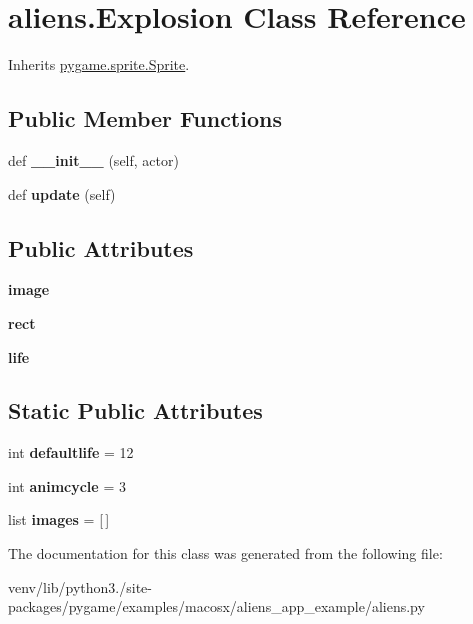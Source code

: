 \hypertarget{classaliens_1_1_explosion}{}\section{aliens.\+Explosion Class Reference}
\label{classaliens_1_1_explosion}


Inherits \hyperlink{classpygame_1_1sprite_1_1_sprite}{pygame.\+sprite.\+Sprite}.

\subsection*{Public Member Functions}
\begin{DoxyCompactItemize}
\item 
\mbox{\label{classaliens_1_1_explosion_a8f5dbf53038e55b33cdd5db265a7d8c6}} 
def {\bfseries \+\_\+\+\_\+init\+\_\+\+\_\+} (self, actor)
\item 
\mbox{\label{classaliens_1_1_explosion_a0440ed5f3211908560470309262a7822}} 
def {\bfseries update} (self)
\end{DoxyCompactItemize}
\subsection*{Public Attributes}
\begin{DoxyCompactItemize}
\item 
\mbox{\label{classaliens_1_1_explosion_af6c714dd11b3957b575b563ebb7a6f40}} 
{\bfseries image}
\item 
\mbox{\label{classaliens_1_1_explosion_a1112e2315638f71a08b31e8c18a6ef16}} 
{\bfseries rect}
\item 
\mbox{\label{classaliens_1_1_explosion_a02983ea0b6b88ebb2cdeb3928ae2f565}} 
{\bfseries life}
\end{DoxyCompactItemize}
\subsection*{Static Public Attributes}
\begin{DoxyCompactItemize}
\item 
\mbox{\label{classaliens_1_1_explosion_a64914552e3c893dbb758866016aec9a1}} 
int {\bfseries defaultlife} = 12
\item 
\mbox{\label{classaliens_1_1_explosion_a0e69f9bbecefa547a5e7585cdf38a151}} 
int {\bfseries animcycle} = 3
\item 
\mbox{\label{classaliens_1_1_explosion_a53ddb4dda5ba7c30754998806ca96170}} 
list {\bfseries images} = \mbox{[}$\,$\mbox{]}
\end{DoxyCompactItemize}


The documentation for this class was generated from the following file\+:\begin{DoxyCompactItemize}
\item 
venv/lib/python3./site-\/packages/pygame/examples/macosx/aliens\+\_\+app\+\_\+example/aliens.\+py\end{DoxyCompactItemize}
